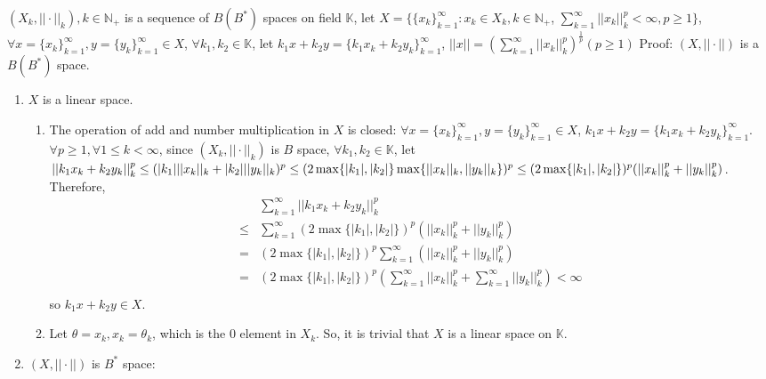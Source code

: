 \documentclass{ctexart}
\begin{document}
    
    \begin{problem}
        $(X_k,||\cdot||_k), k\in \mathbb{N}_+$ is a sequence of $B(B^*)$ spaces on field $\mathbb{K}$, let $X=\{\{x_k\}_{k=1}^{\infty}: x_k\in X_k, k\in \mathbb{N}_+$, $\sum_{k=1}^{\infty}||x_k||_k^p<\infty, p\geq 1\}$, $\forall x=\{x_k\}_{k=1}^{\infty},y=\{y_k\}_{k=1}^{\infty}\in X$, $\forall k_1,k_2\in \mathbb{K}$, let $k_1x+k_2y=\{k_1x_k+k_2y_k\}_{k=1}^{\infty}$, $||x||=(\sum_{k=1}^{\infty}||x_k||_k^p)^{\frac{1}{p}}(p\geq 1)$
        Proof: $(X,||\cdot||)$ is a $B(B^*)$ space.
    \end{problem}
    \begin{solution}
        \newcommand*{\Iff}{\iff}
        \begin{enumerate}
            \item $X$ is a linear space. 
            \begin{enumerate}
            \item The operation of add and number multiplication in $X$ is closed: $\forall x=\{x_k\}_{k=1}^{\infty},y=\{y_k\}_{k=1}^{\infty}\in X$, $k_1x+k_2y=\{k_1x_k+k_2y_k\}_{k=1}^{\infty}$. $\forall p\geq 1,\forall 1\leq k<\infty$, since $(X_k,||\cdot||_k)$ is $B$ space, $\forall k_1,k_2\in \mathbb{K}$, let $||k_1x_k+k_2y_k||_k^p\leq (|k_1|||x_k||_k+|k_2|||y_k||_k)^p\\
            \leq (2\max\{|k_1|, |k_2|\}\max\{||x_k||_k,||y_k||_k\})^p\leq(2\max\{|k_1|, |k_2|\})^p(||x_k||_k^p+||y_k||_k^p)$. 
            Therefore, \begin{equation}
            \begin{aligned}
            &\sum_{k=1}^{\infty}||k_1x_k+k_2y_k||_k^p\\
            \leq &\sum_{k=1}^{\infty}(2\max\{|k_1|, |k_2|\})^p(||x_k||_k^p+||y_k||_k^p)\\
            =&(2\max\{|k_1|, |k_2|\})^p\sum_{k=1}^{\infty}(||x_k||_k^p+||y_k||_k^p)\\
            =&(2\max\{|k_1|, |k_2|\})^p(\sum_{k=1}^{\infty}||x_k||_k^p+\sum_{k=1}^{\infty}||y_k||_k^p)<\infty \\
            \end{aligned}
            \end{equation}
            so $k_1x+k_2y\in X$.
            \item Let $\theta={x_k}, x_k=\theta_k$, which is the $0$ element in $X_k$. So, it is trivial that $X$ is a linear space on $\mathbb{K}$.
            \end{enumerate}
        \item $(X,||\cdot||)$ is $B^*$ space:

\end{enumerate}
\end{solution}
\end{document}
